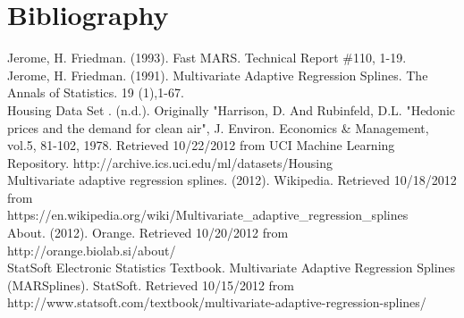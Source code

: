 

\graphicspath{{C:/Documents and Settings/amcelhinney/My Documents/GitHub/MCS507ProjectTwo/tex/include/}}
\newpage

\section{Bibliography} %

\hspace{5 mm} Jerome, H. Friedman. (1993). Fast MARS. Technical Report \#110, 1-19.\\

Jerome, H. Friedman. (1991). Multivariate Adaptive Regression Splines. The Annals of Statistics. 19 (1),1-67.\\

Housing Data Set . (n.d.). Originally "Harrison, D. And Rubinfeld, D.L. "Hedonic prices and the demand for clean air", J. Environ. Economics \& Management, vol.5, 81-102, 1978. Retrieved 10/22/2012 from UCI Machine Learning Repository. http://archive.ics.uci.edu/ml/datasets/Housing\\

Multivariate adaptive regression splines. (2012). Wikipedia. Retrieved 10/18/2012 from \\
https://en.wikipedia.org/wiki/Multivariate\_adaptive\_regression\_splines\\

About. (2012). Orange. Retrieved 10/20/2012 from http://orange.biolab.si/about/\\

StatSoft Electronic Statistics Textbook. Multivariate Adaptive Regression Splines (MARSplines). StatSoft. Retrieved 10/15/2012 from 
\\http://www.statsoft.com/textbook/multivariate-adaptive-regression-splines/\\

